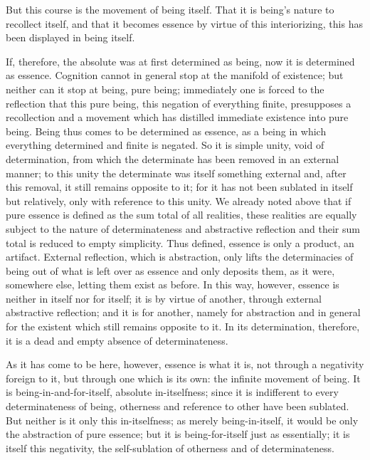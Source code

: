 But this course is the movement of being itself.
That it is being's nature to recollect itself,
and that it becomes essence by virtue of this interiorizing,
this has been displayed in being itself.

If, therefore, the absolute was at first determined as being,
now it is determined as essence.
Cognition cannot in general stop at the manifold of existence;
but neither can it stop at being, pure being;
immediately one is forced to the reflection that
this pure being, this negation of everything finite,
presupposes a recollection and a movement
which has distilled immediate existence into pure being.
Being thus comes to be determined as essence,
as a being in which everything determined and finite is negated.
So it is simple unity, void of determination,
from which the determinate has been removed in an external manner;
to this unity the determinate was itself something external
and, after this removal,
it still remains opposite to it;
for it has not been sublated in itself but relatively,
only with reference to this unity.
We already noted above that if pure essence is defined
as the sum total of all realities,
these realities are equally subject to
the nature of determinateness and abstractive reflection
and their sum total is reduced to empty simplicity.
Thus defined, essence is only a product, an artifact.
External reflection, which is abstraction, only lifts
the determinacies of being out of what is left over as essence
and only deposits them, as it were, somewhere else,
letting them exist as before.
In this way, however, essence is neither in itself nor for itself;
it is by virtue of another, through external abstractive reflection;
and it is for another, namely for abstraction
and in general for the existent
which still remains opposite to it.
In its determination, therefore,
it is a dead and empty absence of determinateness.

As it has come to be here, however,
essence is what it is,
not through a negativity foreign to it,
but through one which is its own:
the infinite movement of being.
It is being-in-and-for-itself,
absolute in-itselfness;
since it is indifferent to every determinateness of being,
otherness and reference to other have been sublated.
But neither is it only this in-itselfness;
as merely being-in-itself, it would be only the abstraction of pure essence;
but it is being-for-itself just as essentially;
it is itself this negativity,
the self-sublation of otherness and of determinateness.

